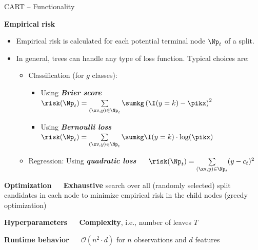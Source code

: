 \documentclass[11pt,compress,t,notes=noshow, xcolor=table]{beamer}
\newcommand{\bfit}[1]{\textbf{\textit{#1}}}
\newcommand{\highlight}[1]{\textcolor{highlightcol}{\textbf{#1}}}
\begin{document}

\begin{frame}{CART -- Functionality}

\footnotesize

\highlight{Empirical risk} \\

\begin{itemize}
  \item Empirical risk is calculated for each potential terminal node $\Np_t$
  of a split.
  \item In general, trees can handle any type of loss function. Typical choices
  are:
  \begin{itemize}
    \footnotesize
    \item Classification (for $g$ classes):
    \begin{itemize}
      \footnotesize
      \item Using \bfit{Brier score} ~~
      $\risk(\Np_t) = \sum\limits_{(\xv,y) \in \Np_t} \sumkg \left( \I(y = k)
      - \pikx \right)^2$
      \item Using \bfit{Bernoulli loss} ~~
      $\risk(\Np_t) = \sum\limits_{(\xv,y) \in \Np_t} \sumkg \I(y = k) \cdot
      \log(\pikx)$
    \end{itemize}
    \item Regression: Using \bfit{quadratic loss} ~~
    $\risk(\Np_t) = \sum\limits_{(\xv,y) \in \Np_t} (y - c_t)^2$
  \end{itemize}
\end{itemize}

\medskip

\highlight{Optimization} ~~ \textbf{Exhaustive} search over
all (randomly selected) split candidates in each node to minimize empirical risk 
in the child nodes (greedy optimization) \\

\medskip

\highlight{Hyperparameters} ~~ \textbf{Complexity}, i.e., 
number of leaves $T$ \\

\medskip

\highlight{Runtime behavior} ~~ $\mathcal{O}(n^2 \cdot d)$ for $n$ 
observations and $d$ features

\normalsize
  
\end{frame}

\end{document}
